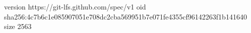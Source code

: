 version https://git-lfs.github.com/spec/v1
oid sha256:4c7b6c1e085907051e708dc2cba569951b7e071fe4355cf96142263f1b141640
size 2563
